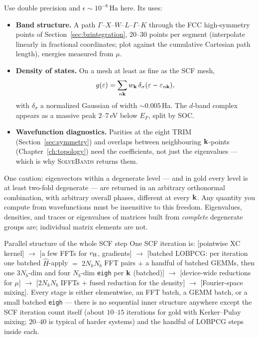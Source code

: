Use double precision and $\epsilon \sim 10^{-8}$\,Ha here. Its uses:
\begin{itemize}[leftmargin=2em]
\item \textbf{Band structure.} A path
$\Gamma$--$X$--$W$--$L$--$\Gamma$--$K$ through the FCC high-symmetry points
of Section~\ref{sec:bzintegration}, 20--30 points per segment (interpolate
linearly in fractional coordinates; plot against the cumulative Cartesian
path length), energies measured from $\mu$.
\item \textbf{Density of states.} On a mesh at least as fine as the SCF
mesh,
\begin{equation}
g(\varepsilon) = \sum_{n\mathbf{k}} w_{\mathbf{k}}\,
\delta_\sigma(\varepsilon - \varepsilon_{n\mathbf{k}}),
\end{equation}
with $\delta_\sigma$ a normalized Gaussian of width $\sim 0.005$\,Ha. The
$d$-band complex appears as a massive peak $2$--$7$\,eV below $E_F$, split
by SOC.
\item \textbf{Wavefunction diagnostics.} Parities at the eight TRIM
(Section~\ref{sec:symmetry}) and overlaps between neighbouring
$\mathbf{k}$-points (Chapter~\ref{ch:topology}) need the coefficients, not just
the eigenvalues --- which is why \textsc{SolveBands} returns them.
\end{itemize}
One caution: eigenvectors within a degenerate level --- and in gold every
level is at least two-fold degenerate --- are returned in an arbitrary
orthonormal combination, with arbitrary overall phases, different at every
$\mathbf{k}$. Any quantity you compute from wavefunctions must be insensitive to
this freedom. Eigenvalues, densities, and traces or eigenvalues of
matrices built from \emph{complete} degenerate groups are; individual
matrix elements are not.

\begin{gpubox}{Parallel structure of the whole SCF step}
One SCF iteration is: [pointwise XC kernel] $\to$ [a few FFTs for
$v_{\mathrm{H}}$, gradients] $\to$ [batched LOBPCG: per iteration one batched
$\hat H$-apply $=$ $2 N_k N_b$ FFT pairs $+$ a handful of batched GEMMs,
then one $3N_b$-dim and four $N_b$-dim \texttt{eigh} per $\mathbf{k}$ (batched)] $\to$ [device-wide reductions
for $\mu$] $\to$ [$2 N_k N_b$ IFFTs $+$ fused reduction for the density]
$\to$ [Fourier-space mixing]. Every stage is either elementwise, an FFT
batch, a GEMM batch, or a small batched \texttt{eigh} --- there is no
sequential inner structure anywhere except the SCF iteration count itself
(about $10$--$15$ iterations for gold with Kerker--Pulay mixing; $20$--$40$
is typical of harder systems) and the handful of LOBPCG steps inside each.
\end{gpubox}
